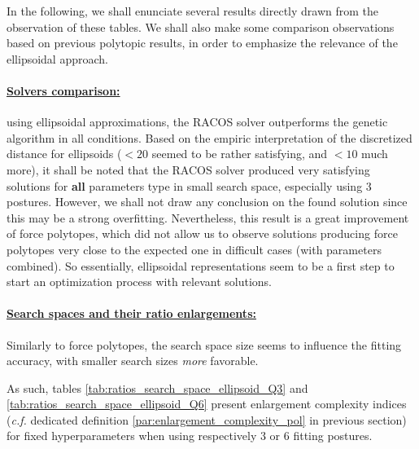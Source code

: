 \clearpage
In the following, we shall enunciate several results directly drawn from the observation of these tables. We shall also make some comparison observations based on previous polytopic results, in order to emphasize the relevance of the ellipsoidal approach.

\paragraph*{\underline{Solvers comparison:}} using ellipsoidal approximations, the RACOS solver outperforms the genetic algorithm in all conditions. Based on the empiric interpretation of the discretized distance for ellipsoids ($< 20$ seemed to be rather satisfying, and $<10$ much more), it shall be noted that the RACOS solver produced very satisfying solutions for \textbf{all} parameters type in small search space, especially using 3 postures. However, we shall not draw any conclusion on the found solution since this may be a strong overfitting. Nevertheless, this result is a great improvement of force polytopes, which did not allow us to observe solutions producing force polytopes very close to the expected one in difficult cases (with parameters combined). So essentially, ellipsoidal representations seem to be a first step to start an optimization process with relevant solutions.

\paragraph*{\underline{Search spaces and their ratio enlargements:}}
Similarly to force polytopes, the search space size seems to influence the fitting accuracy, with smaller search sizes \emph{more} favorable. 

As such, tables \ref{tab:ratios_search_space_ellipsoid_Q3} and \ref{tab:ratios_search_space_ellipsoid_Q6} present enlargement complexity indices (\emph{c.f.} dedicated definition \ref{par:enlargement_complexity_pol} in previous section) for fixed hyperparameters when using respectively 3 or 6 fitting postures.

